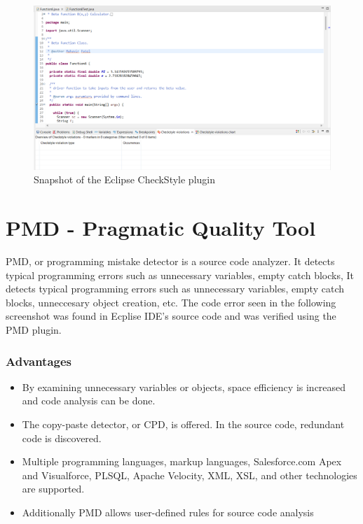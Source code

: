 \documentclass[a4paper, 12pt]{article}
\begin{document}
\begin{figure}[h]
    \centering
    \begin{center}
    \includegraphics[width=1.0\linewidth]{Images/Checkstyle_tool_snapshot.png}    
    \end{center}
    \caption{Snapshot of the Eclipse CheckStyle plugin }
    \label{fig:Eclipse CheckStyle Plugin}
\end{figure}

\newpage
\section*{PMD - Pragmatic Quality Tool}
PMD, or programming mistake detector is a source code analyzer. It detects typical programming errors such as unnecessary variables, empty catch blocks, It detects typical programming errors such as unnecessary variables, empty catch blocks, unneccesary object creation, etc. The code error seen in the following screenshot was found in Ecplise IDE's source code and was verified using the PMD plugin. \\ 
\subsubsection*{Advantages}
    \begin{itemize}[noitemsep]
        \item By examining unnecessary variables or objects, space efficiency is increased and code analysis can be done.
        \item The copy-paste detector, or CPD, is offered. In the source code, redundant code is discovered.
        \item Multiple programming languages, markup languages, Salesforce.com Apex and Visualforce, PLSQL, Apache Velocity, XML, XSL, and other technologies are supported.
        \item Additionally PMD allows user-defined rules for source code analysis
    \end{itemize}
\end{document}
